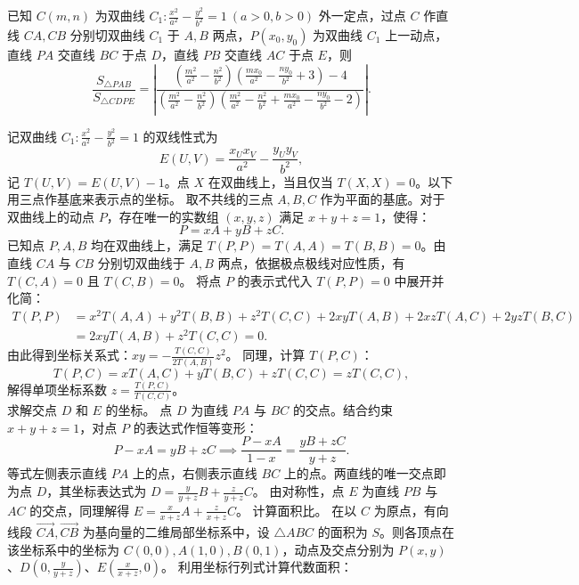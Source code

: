 \begin{example}
已知 \(C(m,n)\) 为双曲线 \(C_1: \frac{x^2}{a^2} - \frac{y^2}{b^2} = 1\ (a>0,b>0)\) 外一定点，过点 \(C\) 作直线 \(CA,CB\) 分别切双曲线 \(C_1\) 于 \(A,B\) 两点，\(P(x_0,y_0)\) 为双曲线 \(C_1\) 上一动点，直线 \(PA\) 交直线 \(BC\) 于点 \(D\)，直线 \(PB\) 交直线 \(AC\) 于点 \(E\)，则
\[ \frac{S_{\triangle PAB}}{S_{\triangle CDPE}} = \left| \frac{ \left( \frac{m^2}{a^2} - \frac{n^2}{b^2} \right)\left( \frac{mx_0}{a^2} - \frac{ny_0}{b^2} + 3 \right) - 4 }{ \left( \frac{m^2}{a^2} - \frac{n^2}{b^2} \right)\left( \frac{m^2}{a^2} - \frac{n^2}{b^2} + \frac{mx_0}{a^2} - \frac{ny_0}{b^2} - 2 \right) } \right|. \]
\end{example}
\begin{solution}
记双曲线 $C_1: \frac{x^2}{a^2} - \frac{y^2}{b^2} = 1$ 的双线性式为
\[ E(U, V) = \frac{x_U x_V}{a^2} - \frac{y_U y_V}{b^2}, \]
记 $T(U, V) = E(U, V) - 1$。点 $X$ 在双曲线上，当且仅当 $T(X, X) = 0$。以下用三点作基底来表示点的坐标。
取不共线的三点 $A, B, C$ 作为平面的基底。对于双曲线上的动点 $P$，存在唯一的实数组 $(x, y, z)$ 满足 $x + y + z = 1$，使得：
\[ P = xA + yB + zC. \]
已知点 $P, A, B$ 均在双曲线上，满足 $T(P,P) = T(A,A) = T(B,B) = 0$。由直线 $CA$ 与 $CB$ 分别切双曲线于 $A, B$ 两点，依据极点极线对应性质，有 $T(C,A) = 0$ 且 $T(C,B) = 0$。
将点 $P$ 的表示式代入 $T(P,P) = 0$ 中展开并化简：
\begin{align*}
T(P,P) &= x^2 T(A,A) + y^2 T(B,B) + z^2 T(C,C) + 2xy T(A,B) + 2xz T(A,C) + 2yz T(B,C) \\
&= 2xy T(A,B) + z^2 T(C,C) = 0.
\end{align*}
由此得到坐标关系式：$xy = -\frac{T(C,C)}{2 T(A,B)} z^2$。
同理，计算 $T(P,C)$：
\[ T(P,C) = x T(A,C) + y T(B,C) + z T(C,C) = z T(C,C), \]
解得单项坐标系数 $z = \frac{T(P,C)}{T(C,C)}$。\\
求解交点 $D$ 和 $E$ 的坐标。
点 $D$ 为直线 $PA$ 与 $BC$ 的交点。结合约束 $x+y+z=1$，对点 $P$ 的表达式作恒等变形：
\[ P - xA = yB + zC \implies \frac{P - xA}{1-x} = \frac{yB + zC}{y+z}. \]
等式左侧表示直线 $PA$ 上的点，右侧表示直线 $BC$ 上的点。两直线的唯一交点即为点 $D$，其坐标表达式为 $D = \frac{y}{y+z}B + \frac{z}{y+z}C$。
由对称性，点 $E$ 为直线 $PB$ 与 $AC$ 的交点，同理解得 $E = \frac{x}{x+z}A + \frac{z}{x+z}C$。
计算面积比。
在以 $C$ 为原点，有向线段 $\overrightarrow{CA}, \overrightarrow{CB}$ 为基向量的二维局部坐标系中，设 $\triangle ABC$ 的面积为 $S$。则各顶点在该坐标系中的坐标为 $C(0,0), A(1,0), B(0,1)$，动点及交点分别为 $P(x,y)$、$D\left(0, \frac{y}{y+z}\right)$、$E\left(\frac{x}{x+z}, 0\right)$。
利用坐标行列式计算代数面积：

\end{solution}
